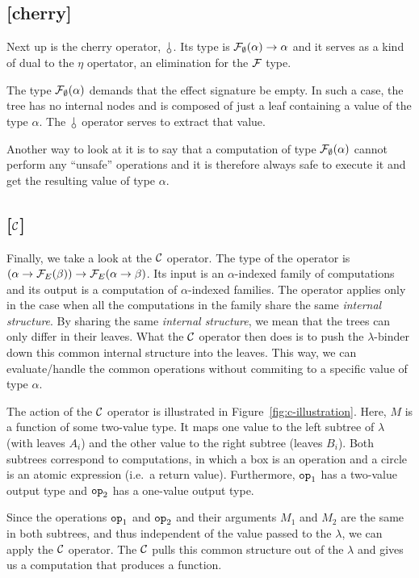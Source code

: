 \subsection*{[cherry]}

Next up is the cherry operator, $\cherry$. Its type is
$\mathcal{F}_\emptyset(\alpha) \to \alpha$ and it serves as a kind of dual to the
$\eta$ opertator, an elimination for the $\mathcal{F}$ type.

The type $\mathcal{F}_\emptyset(\alpha)$ demands that the effect signature be
empty. In such a case, the tree has no internal nodes and is composed of
just a leaf containing a value of the type $\alpha$. The $\cherry$ operator
serves to extract that value.

Another way to look at it is to say that a computation of type
$\mathcal{F}_\emptyset(\alpha)$ cannot perform any ``unsafe'' operations and it is
therefore always safe to execute it and get the resulting value of type
$\alpha$.

\subsection*{[$\mathcal{C}$]}

Finally, we take a look at the $\mathcal{C}$ operator. The type of the operator is
$(\alpha \to \mathcal{F}_E(\beta)) \to \mathcal{F}_E(\alpha \to \beta)$. Its input is an
$\alpha$-indexed family of computations and its output is a computation of
$\alpha$-indexed families. The operator applies only in the case when all
the computations in the family share the same \emph{internal structure}. By
sharing the same \emph{internal structure}, we mean that the trees can only
differ in their leaves. What the $\mathcal{C}$ operator then does is to push the
$\lambda$-binder down this common internal structure into the leaves. This
way, we can evaluate/handle the common operations without commiting to a
specific value of type $\alpha$.

The action of the $\mathcal{C}$ operator is illustrated in
Figure~\ref{fig:c-illustration}. Here, $M$ is a function of some two-value
type. It maps one value to the left subtree of $\lambda$ (with leaves
$A_i$) and the other value to the right subtree (leaves $B_i$). Both
subtrees correspond to computations, in which a box is an operation and a
circle is an atomic expression (i.e.\ a return value). Furthermore,
$\mathtt{op}_1$ has a two-value output type and $\mathtt{op}_2$ has a one-value
output type.

Since the operations $\mathtt{op}_1$ and $\mathtt{op}_2$ and their arguments $M_1$
and $M_2$ are the same in both subtrees, and thus independent of the value
passed to the $\lambda$, we can apply the $\mathcal{C}$ operator. The $\mathcal{C}$ pulls
this common structure out of the $\lambda$ and gives us a computation that
produces a function.

